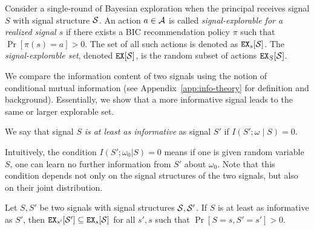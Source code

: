 
\begin{definition}
	Consider a single-round of Bayesian exploration when the principal receives signal $S$ with signal structure $\S$. An action $a \in \A$ is called {\em signal-explorable for a realized signal $s$} if there exists a BIC recommendation policy $\pi$ such that $\Pr[\pi(s) = a] > 0$. The set of all such actions is denoted as $\EX_s[\S]$. The {\em signal-explorable set}, denoted $\EX[\S]$, is the random subset of actions $\EX_S[\S]$.
\end{definition}



We compare the information content of two signals using the notion of conditional mutual information (see Appendix~\ref{app:info-theory} for definition and background). Essentially, we show that a more informative signal leads to the same or larger explorable set.

\begin{definition}
	We say that signal $S$ \emph{is at least as informative} as signal $S'$ if $I(S' ; \omega\mid S) = 0$.
\end{definition}


Intuitively, the condition $I(S';\omega_0|S)= 0$  means if one is given random variable $S$, one can learn no further information from $S'$ about $\omega_0$. Note that this condition depends not only on the signal structures of the two signals, but also on their joint distribution.

\begin{lemma}
	\label{lem:infomono}
	Let $S,S'$ be two signals with signal structures $\S,\S'$. If $S$ is at least as informative as $S'$, then $\EX_{s'}[\S'] \subseteq \EX_s[\S]$ for all $s' ,s$ such that $\Pr[S= s, S'= s'] > 0$.
\end{lemma}

